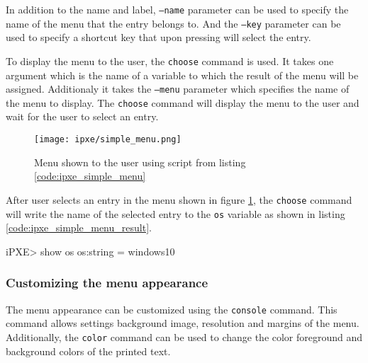 \documentclass[../main.tex]{subfiles}
\begin{document}
In addition to the name and label, \texttt{--name} parameter can be used to specify the name of the menu that the entry belongs to. And the \texttt{--key}
parameter can be used to specify a shortcut key that upon pressing will select the entry.


To display the menu to the user, the \texttt{choose} command is used.
It takes one argument which is the name of a variable to which the result of the menu will be assigned.
Additionaly it takes the \texttt{--menu} parameter which specifies the name of the menu to display.
The \texttt{choose} command will display the menu to the user and wait for the user to select an entry.

\begin{listing}[H]
  \caption{Simple iPXE menu for choosing OS to boot}
  \label{code:ipxe_simple_menu}
\end{listing}

\begin{figure}[H]
  \centering
  \texttt{[image: ipxe/simple\_menu.png]}
  \caption{Menu shown to the user using script from listing \ref{code:ipxe_simple_menu}}
  \label{fig:ipxe_simple_menu}
\end{figure}

After user selects an entry in the menu shown in figure \ref{fig:ipxe_simple_menu}, the \texttt{choose} command will write the name of the selected entry to the \texttt{os} variable
as shown in listing \ref{code:ipxe_simple_menu_result}.

\begin{listing}[H]
  \begin{textcode}
    iPXE> show os
    os:string = windows10
  \end{textcode}
  \caption{Contents of the \texttt{os} variable after selecting the \texttt{windows10} entry in the menu shown in figure \ref{fig:ipxe_simple_menu}}
  \label{code:ipxe_simple_menu_result}
\end{listing}

\subsubsection{Customizing the menu appearance}

The menu appearance can be customized using the \texttt{console} command.
This command allows settings background image, resolution and margins of the menu.
Additionally, the \texttt{color} command can be used to change the color foreground and background colors of the printed text.
\end{document}
